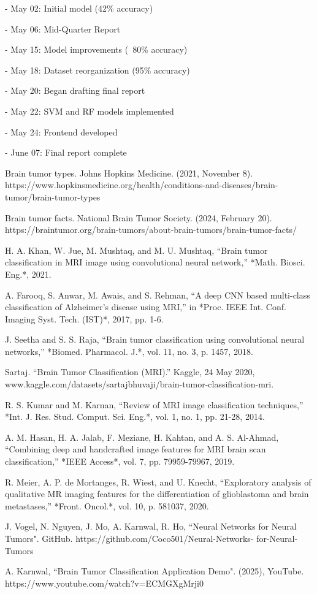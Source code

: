 \documentclass[conference]{IEEEtran}
\begin{document}
- May 02: Initial model (42\% accuracy)

- May 06: Mid-Quarter Report 

- May 15: Model improvements (~80\% accuracy)

- May 18: Dataset reorganization (95\% accuracy)

- May 20: Began drafting final report

- May 22: SVM and RF models implemented

- May 24: Frontend developed

- June 07: Final report complete

\begin{thebibliography}{00}

Brain tumor types. Johns Hopkins Medicine. (2021, November 8). https://www.hopkinsmedicine.org/health/conditions-and-diseases/brain-tumor/brain-tumor-types 

Brain tumor facts. National Brain Tumor Society. (2024, February 20). https://braintumor.org/brain-tumors/about-brain-tumors/brain-tumor-facts/ 

H. A. Khan, W. Jue, M. Mushtaq, and M. U. Mushtaq, “Brain tumor classification in MRI image using convolutional neural network,” *Math. Biosci. Eng.*, 2021. 

A. Farooq, S. Anwar, M. Awais, and S. Rehman, “A deep CNN based multi-class classification of Alzheimer's disease using MRI,” in *Proc. IEEE Int. Conf. Imaging Syst. Tech. (IST)*, 2017, pp. 1-6. 

J. Seetha and S. S. Raja, “Brain tumor classification using convolutional neural networks,” *Biomed. Pharmacol. J.*, vol. 11, no. 3, p. 1457, 2018.

Sartaj. “Brain Tumor Classification (MRI).” Kaggle, 24 May 2020, www.kaggle.com/datasets/sartajbhuvaji/brain-tumor-classification-mri. 

R. S. Kumar and M. Karnan, “Review of MRI image classification techniques,” *Int. J. Res. Stud. Comput. Sci. Eng.*, vol. 1, no. 1, pp. 21-28, 2014. 

A. M. Hasan, H. A. Jalab, F. Meziane, H. Kahtan, and A. S. Al-Ahmad, “Combining deep and handcrafted image features for MRI brain scan classification,” *IEEE Access*, vol. 7, pp. 79959-79967, 2019. 

R. Meier, A. P. de Mortanges, R. Wiest, and U. Knecht, “Exploratory analysis of qualitative MR imaging features for the differentiation of glioblastoma and brain metastases,” *Front. Oncol.*, vol. 10, p. 581037, 2020.

J. Vogel, N. Nguyen, J. Mo, A. Karnwal, R. Ho, ``Neural Networks for Neural Tumors". GitHub. https://github.com/Coco501/Neural-Networks-
for-Neural-Tumors

A. Karnwal, ``Brain Tumor Classification Application Demo". (2025), YouTube. https://www.youtube.com/watch?v=ECMGXgMrji0

\end{thebibliography}
\end{document}
